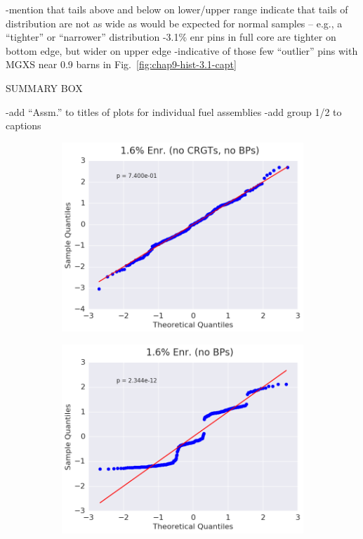 -mention that tails above and below on lower/upper range indicate that tails of distribution are not as wide as would be expected for normal samples -- e.g., a ``tighter'' or ``narrower'' distribution
-3.1\% enr pins in full core are tighter on bottom edge, but wider on upper edge
  -indicative of those few ``outlier'' pins with \ac{MGXS} near 0.9 barns in Fig.~\ref{fig:chap9-hist-3.1-capt}
  
SUMMARY BOX

-add ``Assm.'' to titles of plots for individual fuel assemblies
-add group 1/2 to captions

\begin{figure}[h!]
\centering
\begin{subfigure}{0.5\textwidth}
  \centering
  \includegraphics[width=\linewidth]{figures/patterns/assm-1.6-inf/quantile/assm-16-inf-capt-1}
  \caption{}
  \label{fig:chap9-qq-assm-1.6-inf-capt}
\end{subfigure}%
\begin{subfigure}{0.5\textwidth}
  \centering
  \includegraphics[width=\linewidth]{figures/patterns/assm-1.6/quantile/assm-16-capt-1}

\end{subfigure}
\end{figure}
